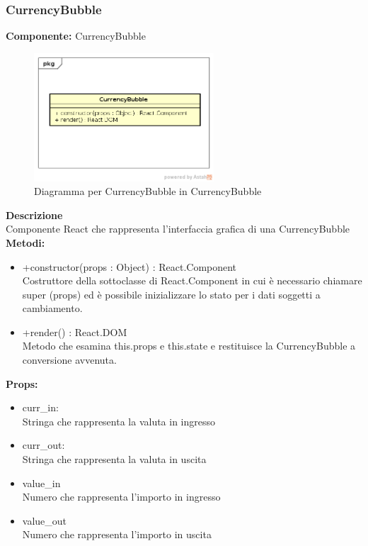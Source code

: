 \subsubsection{CurrencyBubble}
\textbf{Componente:}  CurrencyBubble\\
   \FloatBarrier
   \begin{figure}[ht]
   \centering
   \includegraphics[width=0.6\textwidth]{img/single-CurrencyBubble.png}
   \caption{{Diagramma per CurrencyBubble in CurrencyBubble}}
\end{figure}
\FloatBarrier
\textbf{Descrizione}\\
Componente React che rappresenta l'interfaccia grafica di una CurrencyBubble
\\
\textbf{Metodi:} 
\begin{itemize}
\item +constructor(props : Object) : React.Component 
\\
Costruttore della sottoclasse di React.Component in cui è necessario chiamare super (props) ed è possibile inizializzare lo stato per i dati soggetti a cambiamento.

\item +render() : React.DOM 
\\
Metodo che esamina this.props e this.state e restituisce la CurrencyBubble a conversione avvenuta.

\end{itemize}

\textbf{Props:} 
\begin{itemize}
\item curr\_in: 
\\
Stringa che rappresenta la valuta in ingresso
\item curr\_out: 
\\
Stringa che rappresenta la valuta in uscita
\item value\_in
\\
Numero che rappresenta l'importo in ingresso
\item value\_out
\\
Numero che rappresenta l'importo in uscita

\end{itemize} 


